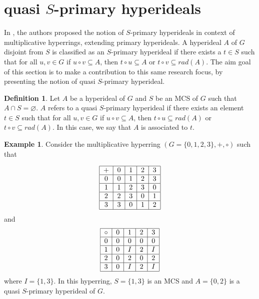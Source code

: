 \documentclass[preprint,review,10pt]{amsart}
\theoremstyle{definition}
\newtheorem{definition}[theorem]{Definition}
\newtheorem{example}[theorem]{Example}
\theoremstyle{remark}
\numberwithin{equation}{section}
\begin{document}
\section{  quasi $S$-primary hyperideals }
In \cite{Ghiasvand3}, the authors proposed the notion of $S$-primary hyperideals in context of multiplicative hyperrings, extending primary hyperideals. A hyperideal $A$ of $G$ disjoint from $S$ is classified as an $S$-primary hyperideal if there exists a $t \in S$ such that for all $u,v \in G$ if $u \circ v \subseteq A$, then $t \circ u \subseteq A$ or $t \circ v \subseteq rad(A)$. The aim goal of this section  is to make a contribution to this same research focus, by presenting the
notion of quasi $S$-primary hyperideal.
\begin{definition}
Let $A$ be a  hyperideal of $G$ and $S$ be an MCS of $G$ such that $A \cap S=\varnothing$. $A$ refers to a quasi $S$-primary hyperideal if there exists an element  $t \in S$ such that for all $u,v \in G$ if $u \circ v \subseteq A$, then $t \circ u \subseteq rad(A)$ or $t \circ v \subseteq rad(A)$. In this case, we say that $A$ is associated to $t$.
\end{definition}
 \begin{example} \label{madar} 
Consider the multiplicative hyperring  $(G=\{0,1,2,3\},+,\circ)$ such that 

\[\begin{tabular}{|c|c|c|c|c|} 
\hline $+$ & $0$ & $1$ & $2$ & $3$ 
\\ \hline $0$ & $0$ & $1$ & $2$ & $3$ 
\\ \hline $1$ & $1$ & $2$ & $3$ & $0$ 
\\ \hline$2$ & $2$ & $3$ & $0$ &$1$ 
\\ \hline $3$ & $3$ & $0$ & $1$ & $2$
\\ \hline
\end{tabular}\]
and
\[\begin{tabular}{|c|c|c|c|c|} 
\hline $\circ$ & $0$ & $1$ & $2$ & $3$ 
\\ \hline $0$ & $0$ & $0$ & $0$ & $0$ 
\\ \hline $1$ & $0$ & $I$ & $2$ & $I$ 
\\ \hline$2$ & $0$ & $2$ & $0$ &$2$ 
\\ \hline $3$ & $0$ & $I$ & $2$ & $I$
\\ \hline
\end{tabular}\]
where $I=\{1,3\}$. In this hyperring, $S=\{1,3\}$ is an MCS and $A=\{0,2\}$ is a quasi $S$-primary hyperideal of $G$.
\end{example}
\end{document}
